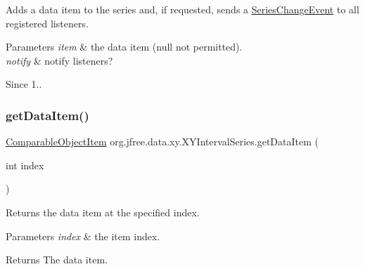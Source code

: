 Adds a data item to the series and, if requested, sends a \mbox{\hyperlink{}{Series\+Change\+Event}} to all registered listeners.


\begin{DoxyParams}{Parameters}
{\em item} & the data item ({\ttfamily null} not permitted). \\
\hline
{\em notify} & notify listeners?\\
\hline
\end{DoxyParams}
\begin{DoxySince}{Since}
1.. 
\end{DoxySince}
\mbox{\label{classorg_1_1jfree_1_1data_1_1xy_1_1_x_y_interval_series_acf462ce44f7eca2502b5141e609e0e25}} 
\subsubsection{\texorpdfstring{get\+Data\+Item()}{getDataItem()}}
{\footnotesize\ttfamily \mbox{\hyperlink{classorg_1_1jfree_1_1data_1_1_comparable_object_item}{Comparable\+Object\+Item}} org.\+jfree.\+data.\+xy.\+X\+Y\+Interval\+Series.\+get\+Data\+Item (\begin{DoxyParamCaption}\item[{int}]{index }\end{DoxyParamCaption})}

Returns the data item at the specified index.


\begin{DoxyParams}{Parameters}
{\em index} & the item index.\\
\hline
\end{DoxyParams}
\begin{DoxyReturn}{Returns}
The data item. 
\end{DoxyReturn}
\mbox{\label{classorg_1_1jfree_1_1data_1_1xy_1_1_x_y_interval_series_afd03e2d1068ff8f2021602f034386a22}} 

